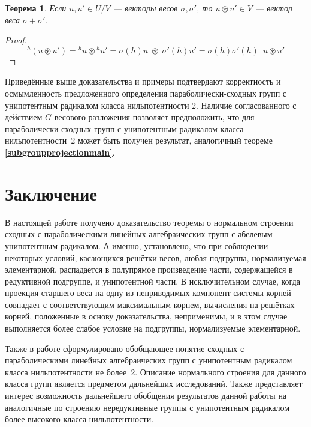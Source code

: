 \documentclass[12pt]{matmex-diploma}
\theoremstyle{mystyleni}
\theoremstyle{mystyle}
\newtheorem{thm}{Теорема}
\newcommand\refb[1]{\textbf{\ref{#1}}}
\begin{document}
\begin{thm}
Если $u,u' \in U/V$ --- векторы весов $\sigma, \sigma'$, то $u \circledast u' \in V$ --- вектор веса $\sigma + \sigma'$.
\end{thm}
\begin{proof}
$$
{}^h(u \circledast u') = {}^h u  \circledast {}^h u' = \sigma(h) u \; \circledast \; \sigma'(h) u' = \sigma(h)\sigma'(h) \enspace u \circledast u'
$$
\end{proof}


Приведённые выше доказательства  и примеры подтвердают корректность и осмымленность предложенного определения параболически-сходных групп с унипотентным радикалом класса нильпотентности 2.
Наличие согласованного с действием $G$ весового разложения позволяет предположить, что для параболически-сходных групп с унипотентным радикалом класса нильпотентности~2 может быть получен результат, аналогичный теореме \refb{subgroupprojectionmain}.

\section{Заключение}

В настоящей работе получено доказательство теоремы о нормальном строении сходных с параболическими линейных алгебраических групп с абелевым унипотентным радикалом.
А именно, установлено, что при соблюдении некоторых условий, касающихся решётки весов, любая подгруппа, нормализуемая элементарной, распадается в полупрямое произведение части, содержащейся в редуктивной подгруппе, и унипотентной части. В исключительном случае, когда проекция старшего веса на одну из неприводимых компонент системы корней совпадает с соответствующим максимальным корнем, вычисления на решётках корней, положенные в основу доказательства, неприменимы, и в этом случае выполняется более слабое условие на подгруппы, нормализуемые элементарной.

Также в работе сформулировано обобщающее понятие сходных с параболическими линейных алгебраических групп с унипотентным радикалом класса нильпотентности не более~2. Описание нормального строения для данного класса групп является предметом дальнейших исследований.
Также представляет интерес возможность дальнейшего обобщения результатов данной работы на аналогичные по строению нередуктивные группы с унипотентным радикалом более высокого класса нильпотентности.



\end{document}

